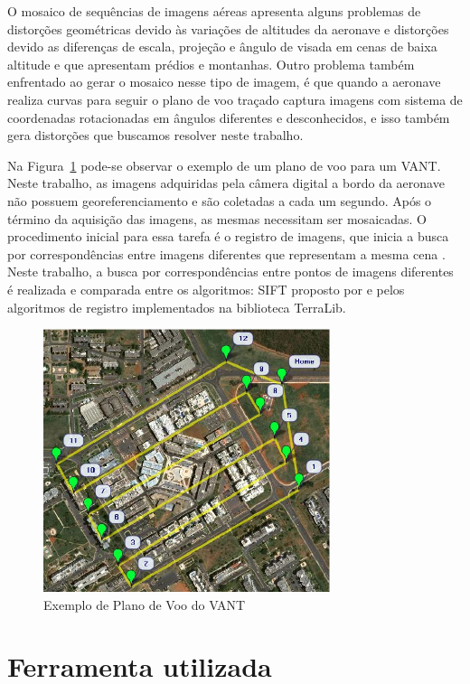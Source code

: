 \documentclass[9pt, a4paper, nofonttune, journal]{IEEEtran}
\begin{document}
O mosaico de sequências de imagens aéreas apresenta alguns problemas de distorções geométricas devido às variações de altitudes da aeronave e 
distorções devido as diferenças de escala, projeção e ângulo de visada em cenas de baixa altitude e que apresentam prédios e montanhas. 
Outro problema também enfrentado ao gerar o mosaico nesse tipo de imagem, 
é que quando a aeronave realiza curvas para seguir o plano de voo traçado captura imagens com sistema de coordenadas rotacionadas em ângulos diferentes e desconhecidos, 
e isso também gera distorções que buscamos resolver neste trabalho.

Na Figura~\ref{fig:plano_voo} pode-se observar o exemplo de um plano de voo para um VANT. 
Neste trabalho, as imagens adquiridas pela câmera digital a bordo da aeronave não possuem georeferenciamento e são coletadas a cada um segundo. 
Após o término da aquisição das imagens, as mesmas necessitam ser mosaicadas. 
O procedimento inicial para essa tarefa é o registro de imagens, que inicia a busca por correspondências entre imagens diferentes que representam a mesma cena \cite{Goltz:08}. 
Neste trabalho, a busca por correspondências entre pontos de imagens diferentes é realizada e comparada entre os algoritmos: SIFT proposto por \cite{Lowe} 
e pelos algoritmos de registro implementados na biblioteca TerraLib.

\begin{figure}[h!t]
  \centering
  \includegraphics[width=3.3in]{figuras/plano_voo}
  \caption{Exemplo de Plano de Voo do VANT}
  \label{fig:plano_voo}
\end{figure}

\section{Ferramenta utilizada}
\end{document}
